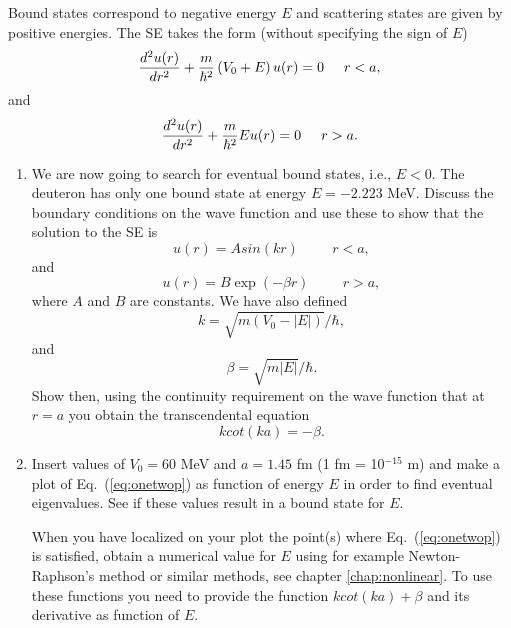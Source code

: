 \begin{prob}
Bound states correspond to negative energy $E$ and scattering states
are given by positive energies.
The SE takes the form (without specifying the sign of $E$)
\begin{equation}
   \frac{d^2u(r)}{dr^2}+\frac{m}{\hbar^2}\left(V_0+E\right)u(r)=0\hspace{0.5cm} r < a,
\end{equation}
and 
\begin{equation}
   \frac{d^2u(r)}{dr^2}+\frac{m}{\hbar^2}Eu(r)=0\hspace{0.5cm} r > a.
\end{equation}
\begin{enumerate}
\item
We are now going to search for eventual bound states,
i.e., $E< 0$. The deuteron has only one bound
state at energy $E=-2.223$ MeV. Discuss the boundary conditions
on the wave function and use these to
show that the solution to the SE is
\begin{equation} 
   u(r)=Asin(kr) \hspace{1cm} r < a,
\end{equation}
and 
\begin{equation}
   u(r)=B\exp{(-\beta r)} \hspace{1cm} r > a,
\end{equation}
where $A$ and $B$ are constants. We have also defined
\begin{equation}
   k=\sqrt{m(V_0-|E|)}/\hbar,
\end{equation}
and 
\begin{equation}
   \beta=\sqrt{m|E|}/\hbar.
\end{equation}
Show then, using the continuity requirement on the wave function that at $r=a$ 
you obtain the transcendental equation
\begin{equation}
   kcot(ka)=-\beta. 
   \label{eq:onetwop}
\end{equation}

\item
Insert values of $V_0=60$ MeV and $a=1.45$ fm (1 fm = 10$^{-15}$ m) 
and make a plot of Eq.\ (\ref{eq:onetwop}) as function of energy $E$
in order to find eventual eigenvalues.
See if these values result in a bound state for $E$.

When you have localized on your plot the point(s) where Eq.\ (\ref{eq:onetwop}) 
is satisfied, obtain a numerical value for $E$ using for example
Newton-Raphson's method or similar methods, see chapter \ref{chap:nonlinear}.
To use these functions  you need to
provide 
the function $kcot(ka)+\beta$ and its derivative as function of $E$. 


\end{enumerate}
\end{prob}
